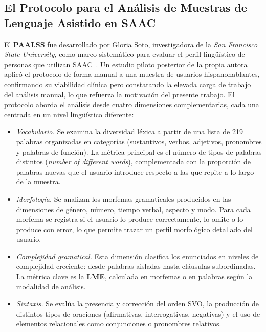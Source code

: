 \subsection{El Protocolo para el Análisis de Muestras de Lenguaje Asistido en SAAC}
\label{subsec:paalss}

El \textbf{\ac{PAALSS}} fue desarrollado por Gloria Soto, investigadora de la 
\emph{San Francisco State University}, como marco sistemático para evaluar el perfil 
lingüístico de personas que utilizan \ac{SAAC}~\cite{soto2020protocolo}. 
Un estudio piloto posterior de la propia autora~\cite{soto2024paalss_pilot} aplicó el 
protocolo de forma manual a una muestra de usuarios hispanohablantes, confirmando su 
viabilidad clínica pero constatando la elevada carga de trabajo del análisis manual, 
lo que refuerza la motivación del presente trabajo. El protocolo aborda el análisis 
desde cuatro dimensiones complementarias, cada una centrada en un nivel lingüístico 
diferente:

\begin{itemize}
  \item \emph{Vocabulario.} Se examina la diversidad léxica a partir de una lista de 219 
  palabras organizadas en categorías (sustantivos, verbos, adjetivos, pronombres y 
  palabras de función). La métrica principal es el número de tipos de palabras distintos 
  (\emph{number of different words}), complementada con la proporción de palabras nuevas 
  que el usuario introduce respecto a las que repite a lo largo de la muestra.

  \item \emph{Morfología.} Se analizan los morfemas gramaticales producidos en las dimensiones
  de género, número, tiempo verbal, aspecto y modo. Para cada morfema se registra si el
  usuario lo produce correctamente, lo omite o lo produce con error, lo que permite trazar 
  un perfil morfológico detallado del usuario.

  \item \emph{Complejidad gramatical.} Esta dimensión clasifica los enunciados en niveles de 
  complejidad creciente: desde palabras aisladas hasta cláusulas subordinadas. La métrica clave 
  es la \textbf{\ac{LME}}, calculada en morfemas o en palabras según la modalidad de análisis.

  \item \emph{Sintaxis.} Se evalúa la presencia y corrección del orden \ac{SVO}, la producción de 
  distintos tipos de oraciones (afirmativas, interrogativas, negativas) y el uso de 
  elementos relacionales como conjunciones o pronombres relativos.
\end{itemize}


